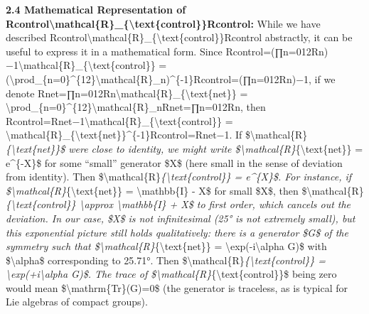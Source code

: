 \documentclass[
]{article}
\begin{document}
\textbf{2.4 Mathematical Representation of
Rcontrol\textbackslash mathcal\{R\}\_\{\textbackslash text\{control\}\}Rcontrol\hspace{0pt}:}
While we have described
Rcontrol\textbackslash mathcal\{R\}\_\{\textbackslash text\{control\}\}Rcontrol\hspace{0pt}
abstractly, it can be useful to express it in a mathematical form. Since
Rcontrol=(∏n=012Rn)−1\textbackslash mathcal\{R\}\_\{\textbackslash text\{control\}\}
=
(\textbackslash prod\_\{n=0\}\^{}\{12\}\textbackslash mathcal\{R\}\_n)\^{}\{-1\}Rcontrol\hspace{0pt}=(∏n=012\hspace{0pt}Rn\hspace{0pt})−1,
if we denote
Rnet=∏n=012Rn\textbackslash mathcal\{R\}\_\{\textbackslash text\{net\}\}
=
\textbackslash prod\_\{n=0\}\^{}\{12\}\textbackslash mathcal\{R\}\_nRnet\hspace{0pt}=∏n=012\hspace{0pt}Rn\hspace{0pt},
then
Rcontrol=Rnet−1\textbackslash mathcal\{R\}\_\{\textbackslash text\{control\}\}
=
\textbackslash mathcal\{R\}\_\{\textbackslash text\{net\}\}\^{}\{-1\}Rcontrol\hspace{0pt}=Rnet−1\hspace{0pt}.
If \$\textbackslash mathcal\{R\}\emph{\{\textbackslash text\{net\}\}\$
were close to identity, we might write
\$\textbackslash mathcal\{R\}}\{\textbackslash text\{net\}\} =
e\^{}\{-X\}\$ for some ``small'' generator \$X\$ (here small in the
sense of deviation from identity). Then
\$\textbackslash mathcal\{R\}\emph{\{\textbackslash text\{control\}\} =
e\^{}\{X\}\$. For instance, if
\$\textbackslash mathcal\{R\}}\{\textbackslash text\{net\}\} =
\textbackslash mathbb\{I\} - X\$ for small \$X\$, then
\$\textbackslash mathcal\{R\}\emph{\{\textbackslash text\{control\}\}
\textbackslash approx \textbackslash mathbb\{I\} + X\$ to first order,
which cancels out the deviation. In our case, \$X\$ is not infinitesimal
(25° is not extremely small), but this exponential picture still holds
qualitatively: there is a generator \$G\$ of the symmetry such that
\$\textbackslash mathcal\{R\}}\{\textbackslash text\{net\}\} =
\textbackslash exp(-i\textbackslash alpha G)\$ with
\$\textbackslash alpha\$ corresponding to 25.71°. Then
\$\textbackslash mathcal\{R\}\emph{\{\textbackslash text\{control\}\} =
\textbackslash exp(+i\textbackslash alpha G)\$. The trace of
\$\textbackslash mathcal\{R\}}\{\textbackslash text\{control\}\}\$ being
zero would mean \$\textbackslash mathrm\{Tr\}(G)=0\$ (the generator is
traceless, as is typical for Lie algebras of compact groups).
\end{document}

